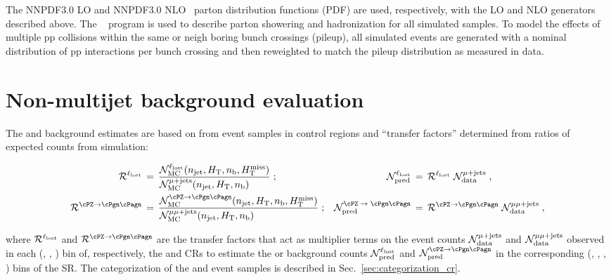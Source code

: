 The \textsc{NNPDF}3.0 LO and \textsc{NNPDF}3.0 NLO~\cite{nnpdf} parton
distribution functions (PDF) are used, respectively, with the LO and
NLO generators described above. The ~\cite{pythia} program
is used to describe parton showering and hadronization for all
simulated samples. To model the effects of multiple pp collisions
within the same or neigh boring bunch crossings (pileup), all simulated
events are generated with a nominal distribution of pp interactions
per bunch crossing and then reweighted to match the pileup
distribution as measured in data.


\section{Non-multijet background evaluation}
\label{sec:ewk}

The \lost and \znunuj background estimates are based on from event
samples in control regions and ``transfer factors'' determined from
ratios of expected counts from simulation:

\begin{align}
  \tf^{\lost} \, & = \,
  \frac{\mathcal{N}^{\lost}_\textrm{MC}(\njet, \scalht, \nb, \mht)}
  {\mathcal{N}^{\mj}_\textrm{MC}(\njet, \scalht, \nb)\hfill} \; ;
  & 
  \mathcal{N}^{\lost}_\textrm{pred} \, & = \,
  \tf^{\lost} \; \mathcal{N}^{\mj}_\textrm{data} \; ,
  \\
  \tf^{\znunu} \, & = \,
  \frac{\mathcal{N}^{\znunu}_\textrm{MC}(\njet, \scalht, \nb, \mht)}
  {\mathcal{N}^{\mmj}_\textrm{MC}(\njet, \scalht, \nb)\hfill} \; ;
  & 
  \mathcal{N}^\textrm{\znunu}_\textrm{pred} \, & = \,
  \tf^{\znunu} \; \mathcal{N}^{\mmj}_\textrm{data} \; ,
\end{align}

where $\mathcal{R}^{\ell_\textrm{lost}}$ and $\tf^{\znunu}$ are the transfer factors that
act as multiplier terms on the event counts
$\mathcal{N}^{\mu + \text{jets}}_\textrm{data}$ and
$\mathcal{N}^{\mu\mu + \text{jets}}_\textrm{data}$ observed in each (\njet, \scalht,
\nb) bin of, respectively, the \mj and \mmj CRs to estimate the \lost
or \znunuj background counts $\mathcal{N}^{\ell_\textrm{lost}}_\textrm{pred}$ and
$\mathcal{N}^{\znunu}_\textrm{pred}$ in the corresponding (\njet,
\scalht, \nb, \mht) bins of the SR. The categorization of the \mj and
\mmj event samples is described in Sec.~\ref{sec:categorization_cr}.

